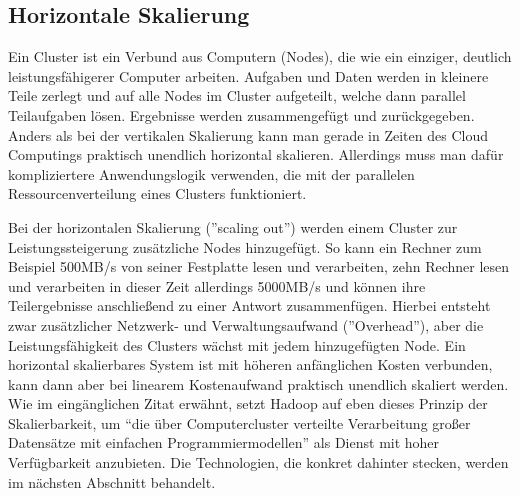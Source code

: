 \subsection{Horizontale Skalierung}
Ein Cluster ist ein Verbund aus Computern (Nodes), die wie ein einziger, deutlich leistungsfähigerer Computer arbeiten. Aufgaben und Daten werden in kleinere Teile zerlegt und auf alle Nodes im Cluster aufgeteilt, welche dann parallel Teilaufgaben lösen. Ergebnisse werden zusammengefügt und zurückgegeben. Anders als bei der vertikalen Skalierung kann man gerade in Zeiten des Cloud Computings praktisch unendlich horizontal skalieren. Allerdings muss man dafür kompliziertere Anwendungslogik verwenden, die mit der parallelen Ressourcenverteilung eines Clusters funktioniert.\cite{noauthor_what_nodate} 
\par
Bei der horizontalen Skalierung (''scaling out'') werden einem Cluster zur Leistungssteigerung zusätzliche Nodes hinzugefügt. So kann ein Rechner zum Beispiel 500MB/s von seiner Festplatte lesen und verarbeiten, zehn Rechner lesen und verarbeiten in dieser Zeit allerdings 5000MB/s und können ihre Teilergebnisse anschließend zu einer Antwort zusammenfügen. Hierbei entsteht zwar zusätzlicher Netzwerk- und Verwaltungsaufwand (''Overhead''), aber die Leistungsfähigkeit des Clusters wächst mit jedem hinzugefügten Node. Ein horizontal skalierbares System ist mit höheren anfänglichen Kosten verbunden, kann dann aber bei linearem Kostenaufwand praktisch unendlich skaliert werden.\cite{noauthor_horizontal_nodate}\\
Wie im eingänglichen Zitat erwähnt, setzt Hadoop auf eben dieses Prinzip der Skalierbarkeit, um ``die über Computercluster verteilte Verarbeitung großer Datensätze mit einfachen Programmiermodellen''\cite{noauthor_apache_nodate} als Dienst mit hoher Verfügbarkeit anzubieten. Die Technologien, die konkret dahinter stecken, werden im nächsten Abschnitt behandelt.

